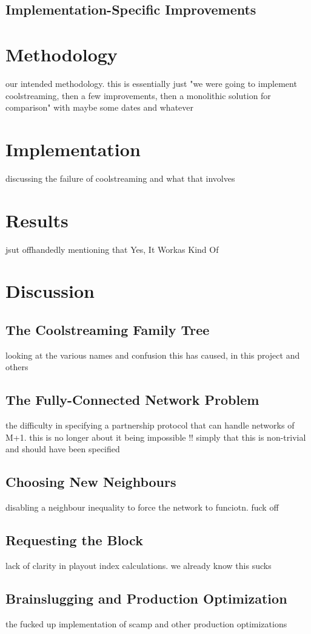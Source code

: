 \documentclass[12pt,a4paper]{article}
\begin{document}
\subsection{Implementation-Specific Improvements}
\section{Methodology}
our intended methodology. this is essentially just "we were going to implement coolstreaming, then a few improvements, then a monolithic solution for comparison" with maybe some dates and whatever
\section{Implementation}
discussing the failure of coolstreaming and what that involves
\section{Results}
jsut offhandedly mentioning that Yes, It Workas Kind Of
\section{Discussion}
\subsection{The Coolstreaming Family Tree}
looking at the various names and confusion this has caused, in this project and others
\subsection{The Fully-Connected Network Problem}
the difficulty in specifying a partnership protocol that can handle networks of M+1. this is no longer about it being impossible !! simply that this is non-trivial and should have been specified
\subsection{Choosing New Neighbours}
disabling a neighbour inequality to force the network to funciotn. fuck off
\subsection{Requesting the Block}
lack of clarity in playout index calculations. we already know this sucks
\subsection{Brainslugging and Production Optimization}
the fucked up implementation of scamp and other production optimizations
\end{document}
